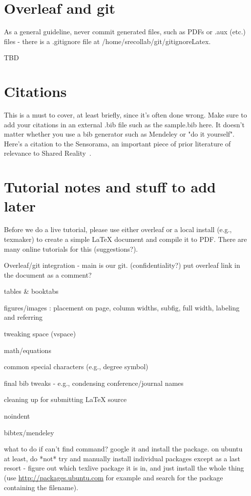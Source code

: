 \documentclass{sigchi}
\begin{document}
\section{Overleaf and git}

As a general guideline, never commit generated files, such as PDFs or .aux (etc.) files - there is a .gitignore file at /home/srecollab/git/gitignoreLatex.

TBD

\section{Citations}

This is a must to cover, at least briefly, since it's often done wrong.  Make sure to add your citations in an external .bib file such as the sample.bib here.  It doesn't matter whether you use a bib generator such as Mendeley or "do it yourself".   Here's a citation to the Sensorama, an important piece of prior literature of relevance to Shared Reality~\cite{heilig:sensorama}.

\section{Tutorial notes and stuff to add later}

Before we do a live tutorial, please use either overleaf or a local install (e.g., texmaker) to create a simple LaTeX document and compile it to PDF.
There are many online tutorials for this (suggestions?).

Overleaf/git integration - main is our git. (confidentiality?) put overleaf link in the document as a comment?

tables \& booktabs

figures/images : placement on page, column widths, subfig, full width, labeling and referring

tweaking space (vspace)

math/equations

common special characters (e.g.,  degree symbol)

final bib tweaks - e.g., condensing conference/journal names

cleaning up for submitting LaTeX source

noindent

bibtex/mendeley

what to do if can't find command? google it and install the package. on ubuntu at least, do *not* try and manually install individual packages except as a last resort - figure out which texlive package it is in, and just install the whole thing (use \url{http://packages.ubuntu.com} for example and search for the package containing the filename).
\end{document}
